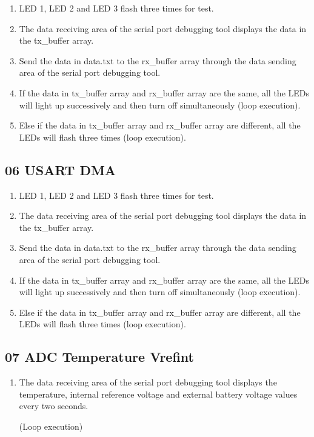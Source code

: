 \documentclass[12pt,a4paper]{ctexart}
\begin{document}
\begin{enumerate}
    \item LED 1, LED 2 and LED 3 flash three times for test.
    \item The data receiving area of the serial port debugging tool displays the data in the tx\_buffer array.
    \item Send the data in data.txt to the rx\_buffer array through the data sending area of the serial port debugging tool.
    \item If the data in tx\_buffer array and rx\_buffer array are the same, all the LEDs will light up successively and then turn off simultaneously (loop execution).
    \item Else if the data in tx\_buffer array and rx\_buffer array are different, all the LEDs will flash three times (loop execution).
\end{enumerate}

\subsection{06 USART DMA}

\begin{enumerate}
    \item LED 1, LED 2 and LED 3 flash three times for test.
    \item The data receiving area of the serial port debugging tool displays the data in the tx\_buffer array.
    \item Send the data in data.txt to the rx\_buffer array through the data sending area of the serial port debugging tool.
    \item If the data in tx\_buffer array and rx\_buffer array are the same, all the LEDs will light up successively and then turn off simultaneously (loop execution).
    \item Else if the data in tx\_buffer array and rx\_buffer array are different, all the LEDs will flash three times (loop execution).
\end{enumerate}

\subsection{07 ADC Temperature Vrefint}

\begin{enumerate}
    \item The data receiving area of the serial port debugging tool displays the temperature, internal reference voltage and external battery voltage values every two seconds.
          
          (Loop execution)
\end{enumerate}
\end{document}
